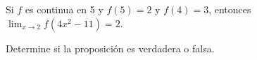 \item Si $f$ es continua en 5 y $f(5) = 2$ y $f(4) = 3$, entonces $\lim_{x \to 2} f(4x^2 - 11) = 2$.
\par
Determine si la proposición es verdadera o falsa.
